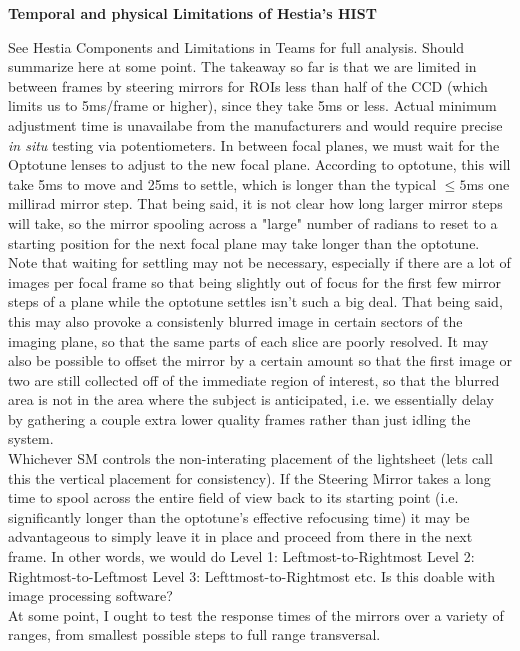 \newpage
\newpage
\begin{center}
    \textbf{Temporal and physical Limitations of Hestia's HIST}
\end{center}
See Hestia Components and Limitations in Teams for full analysis. Should summarize here at some point.
The takeaway so far is that we are limited in between frames by steering mirrors for ROIs less than half of the CCD (which limits us to 5ms/frame or higher), since they take 5ms or less. Actual minimum adjustment time is unavailabe from the manufacturers and would require precise \textit{in situ} testing via potentiometers.
In between focal planes, we must wait for the Optotune lenses to adjust to the new focal plane. According to optotune, this will take 5ms to move and 25ms to settle, which is longer than the typical $\leq 5$ms one millirad mirror step. That being said, it is not  clear how long larger mirror steps will take, so the mirror spooling across a "large" number of radians to reset to a starting position for the next focal plane may take longer than the optotune. Note that waiting for settling may not be necessary, especially if there are a lot of images per focal frame so that being slightly out of focus for the first few mirror steps of a plane while the optotune settles isn't such a big deal. That being said, this may also provoke a consistenly blurred image in certain sectors of the imaging plane, so that the same parts of each slice are poorly resolved. It may also be possible to offset the mirror by a certain amount so that the first image or two are still collected off of the immediate region of interest, so that the blurred area is not in the area where the subject is anticipated, i.e. we essentially delay by gathering a couple extra lower quality frames rather than just idling the system.\\
Whichever SM controls the non-interating placement of the lightsheet (lets call this the vertical placement for consistency). If the Steering Mirror takes a long time to spool across the entire field of view back to its starting point (i.e. significantly longer than the optotune's effective refocusing time) it may be advantageous to simply leave it in place and proceed from there in the next frame. In other words, we would do Level 1: Leftmost-to-Rightmost Level 2: Rightmost-to-Leftmost Level 3: Lefttmost-to-Rightmost etc. Is this doable with image processing software?\\
At some point, I ought to test the response times of the mirrors over a variety of ranges, from smallest possible steps to full range transversal.
